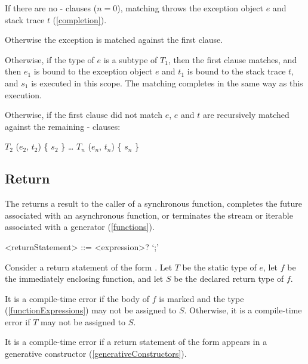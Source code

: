 \documentclass[makeidx]{article}
\begin{document}
{\LMHash{}%
If there are no \ON{}-\CATCH{} clauses ($n = 0$), matching throws the exception object $e$ and stack trace $t$ (\ref{completion}).

\LMHash{}%
Otherwise the exception is matched against the first clause.

\LMHash{}%
Otherwise, if the type of $e$ is a subtype of $T_1$, then the first clause matches, and then $e_1$ is bound to the exception object $e$ and $t_1$ is bound to the stack trace $t$, and $s_1$ is executed in this scope.
The matching completes in the same way as this execution.

\LMHash{}%
Otherwise, if the first clause did not match $e$, $e$ and $t$ are recursively matched against the remaining \ON{}-\CATCH{} clauses:

\begin{normativeDartCode}
\ON{} $T_2$ \CATCH{} ($e_2$, $t_2$) \{ $s_2$ \}
\ldots
\ON{} $T_n$ \CATCH{} ($e_n$, $t_n$) \{ $s_n$ \}
\end{normativeDartCode}


\subsection{Return}

\LMHash{}%
The  returns a result to the caller of a synchronous function,
completes the future associated with an asynchronous function,
or terminates the stream or iterable associated with a generator (\ref{functions}).

\begin{grammar}
<returnStatement> ::= \RETURN{} <expression>? `;'
\end{grammar}

\LMHash{}%
Consider a return statement of the form .
Let $T$ be the static type of $e$, let $f$ be the immediately enclosing function,
and let $S$ be the declared return type of $f$.

\LMHash{}%
It is a compile-time error if the body of $f$ is marked \ASYNC{}
and the type  (\ref{functionExpressions}) may not be assigned to $S$.
Otherwise, it is a compile-time error if $T$ may not be assigned to $S$.

\LMHash{}%
It is a compile-time error if a return statement of the form  appears in a generative constructor (\ref{generativeConstructors}).


}
\end{document}
